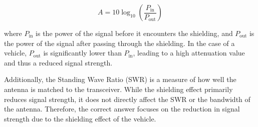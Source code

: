 \[ A = 10 \log_{10} \left( \frac{P_{\text{in}}}{P_{\text{out}}} \right) \]

where \( P_{\text{in}} \) is the power of the signal before it encounters the shielding, and \( P_{\text{out}} \) is the power of the signal after passing through the shielding. In the case of a vehicle, \( P_{\text{out}} \) is significantly lower than \( P_{\text{in}} \), leading to a high attenuation value and thus a reduced signal strength.

Additionally, the Standing Wave Ratio (SWR) is a measure of how well the antenna is matched to the transceiver. While the shielding effect primarily reduces signal strength, it does not directly affect the SWR or the bandwidth of the antenna. Therefore, the correct answer focuses on the reduction in signal strength due to the shielding effect of the vehicle.

